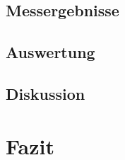 \documentclass[12pt,a4paper]{article}
\begin{document}
\subsection{Messergebnisse}
\subsection{Auswertung}
\subsection{Diskussion}
\section{Fazit}
\end{document}
